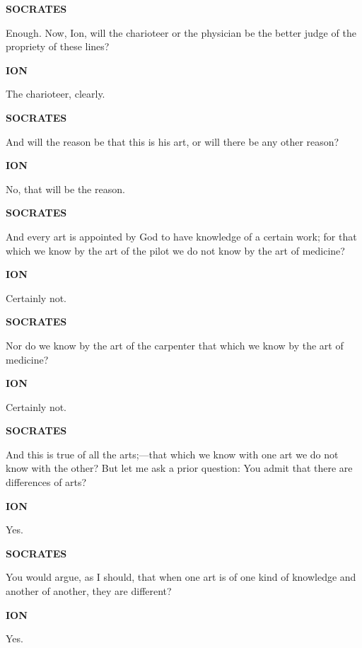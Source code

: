 \documentclass[11pt,letter]{article}
\begin{document}
\par \textbf{SOCRATES}
\par   Enough. Now, Ion, will the charioteer or the physician be the better judge of the propriety of these lines?

\par \textbf{ION}
\par   The charioteer, clearly.

\par \textbf{SOCRATES}
\par   And will the reason be that this is his art, or will there be any other reason?

\par \textbf{ION}
\par   No, that will be the reason.

\par \textbf{SOCRATES}
\par   And every art is appointed by God to have knowledge of a certain work; for that which we know by the art of the pilot we do not know by the art of medicine?

\par \textbf{ION}
\par   Certainly not.

\par \textbf{SOCRATES}
\par   Nor do we know by the art of the carpenter that which we know by the art of medicine?

\par \textbf{ION}
\par   Certainly not.

\par \textbf{SOCRATES}
\par   And this is true of all the arts;—that which we know with one art we do not know with the other? But let me ask a prior question:  You admit that there are differences of arts?

\par \textbf{ION}
\par   Yes.

\par \textbf{SOCRATES}
\par   You would argue, as I should, that when one art is of one kind of knowledge and another of another, they are different?

\par \textbf{ION}
\par   Yes.
\end{document}
